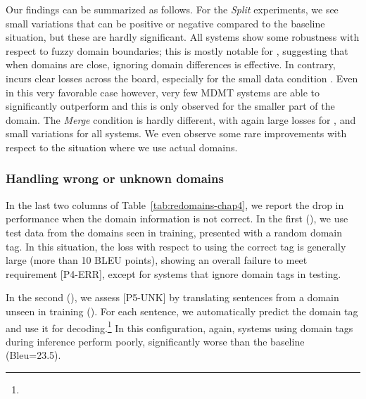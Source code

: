 Our findings can be summarized as follows. For the \textsl{Split} experiments, we see small variations that can be positive or negative compared to the baseline situation, but these are hardly significant. All systems show some robustness with respect to fuzzy domain boundaries; this is mostly notable for , suggesting that when domains are close, ignoring domain differences is effective. In contrary,  incurs clear losses across the board, especially for the small data condition \citep{Miceli17regularization}. Even in this very favorable case however, very few MDMT systems are able to significantly outperform  and this is only observed for the smaller part of the  domain. The \textsl{Merge} condition is hardly different, with again large losses for  , and small variations for all systems. We even observe some rare improvements with respect to the situation where we use actual domains. 

\subsubsection{Handling wrong or unknown domains \label{sssec:unknowns-chap4}}

In the last two columns of Table~\ref{tab:redomains-chap4}, we report the drop in performance when the domain information is not correct. In the first (), we use test data from the domains seen in training, presented with a random domain tag. In this situation, the loss with respect to using the correct tag is generally large (more than 10 BLEU points), showing an overall failure to meet requirement [P4-ERR], except for systems that ignore domain tags in testing. 

In the second (), we assess [P5-UNK] by translating sentences from a domain unseen in training (). For each sentence, we automatically predict the domain tag and use it for decoding.\footnote{}
In this configuration, again, systems using domain tags during inference perform poorly, significantly worse than the  baseline (Bleu=23.5).

